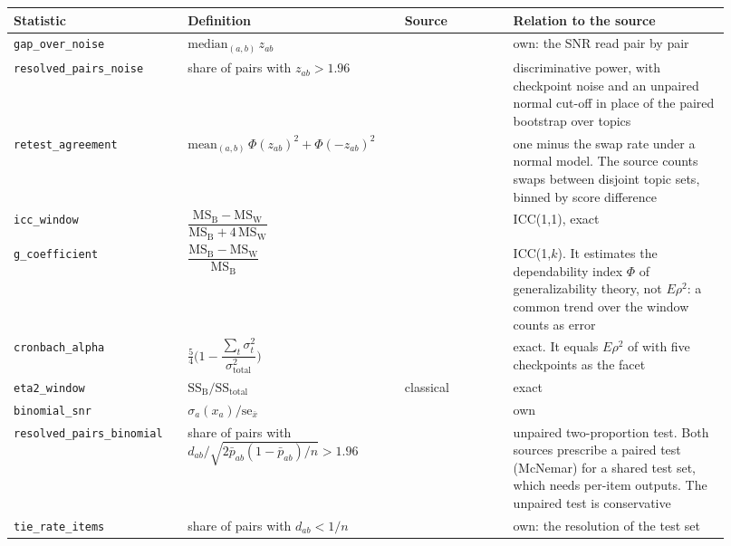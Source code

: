 \begin{table}[h]
\centering
\scriptsize
\begin{tabular}{@{}p{0.215\linewidth}p{0.28\linewidth}p{0.14\linewidth}p{0.285\linewidth}@{}}
\toprule
\textbf{Statistic} & \textbf{Definition} & \textbf{Source} & \textbf{Relation to the source} \\
\midrule
\texttt{gap\_over\_noise} & $\mathrm{median}_{(a,b)}\, z_{ab}$ & \citet{heineman_signal_2025} & own: the SNR read pair by pair \\
\texttt{resolved\_pairs\_noise} & share of pairs with $z_{ab} > 1.96$ & \citet{sakai_evaluating_2006} & discriminative power, with checkpoint noise and an unpaired normal cut-off in place of the paired bootstrap over topics \\
\texttt{retest\_agreement} & $\mathrm{mean}_{(a,b)}\,\Phi(z_{ab})^2 + \Phi(-z_{ab})^2$ & \citet{voorhees_effect_2002} & one minus the swap rate under a normal model. The source counts swaps between disjoint topic sets, binned by score difference \\
\texttt{icc\_window} & $\dfrac{\mathrm{MS_B} - \mathrm{MS_W}}{\mathrm{MS_B} + 4\,\mathrm{MS_W}}$ & \citet{shrout_intraclass_1979} & ICC(1,1), exact \\
\texttt{g\_coefficient} & $\dfrac{\mathrm{MS_B} - \mathrm{MS_W}}{\mathrm{MS_B}}$ & \citet{bodoff_test_2007, urbano_measurement_2013} & ICC(1,$k$). It estimates the dependability index $\Phi$ of generalizability theory, not $E\rho^2$: a common trend over the window counts as error \\
\texttt{cronbach\_alpha} & $\frac{5}{4}\Big(1 - \dfrac{\sum_t \sigma^2_t}{\sigma^2_{\text{total}}}\Big)$ & \citet{cronbach_coefficient_1951} & exact. It equals $E\rho^2$ of \citet{urbano_measurement_2013} with five checkpoints as the facet \\
\texttt{eta2\_window} & $\mathrm{SS_B}/\mathrm{SS_{total}}$ & classical & exact \\
\texttt{binomial\_snr} & $\sigma_a(x_a)/\mathrm{se}_{\bar{x}}$ & \citet{card_little_2020, miller_adding_2024} & own \\
\texttt{resolved\_pairs\_binomial} & share of pairs with $d_{ab}/\sqrt{2\bar{p}_{ab}(1-\bar{p}_{ab})/n} > 1.96$ & \citet{card_little_2020, dror_hitchhikers_2018} & unpaired two-proportion test. Both sources prescribe a paired test (McNemar) for a shared test set, which needs per-item outputs. The unpaired test is conservative \\
\texttt{tie\_rate\_items} & share of pairs with $d_{ab} < 1/n$ & \citet{schaeffer_are_2023} & own: the resolution of the test set \\

\end{tabular}
\end{table}
